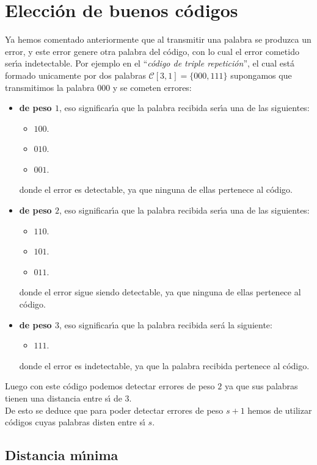 %
%

\section{Elecci\'on de buenos c\'odigos}

Ya hemos comentado anteriormente que al transmitir una palabra se produzca un
error, y este error genere otra palabra del c\'odigo, con lo cual el error
cometido ser\'{\i}a indetectable. Por ejemplo en el ``\emph{c\'odigo de triple
repetici\'on}'', el cual est\'a formado unicamente por dos palabras
$\mathcal{C}[3,1]=\{000,111\}$ supongamos que transmitimos la palabra $000$ y se
cometen errores:
\begin{itemize}
\item \textbf{de peso $1$}, eso significar\'{\i}a que la palabra recibida
ser\'{\i}a una de las siguientes:
\begin{itemize}
\item $100$.
\item $010$.
\item $001$.
\end{itemize}
donde el error es detectable, ya que ninguna de ellas pertenece al c\'odigo.
%
\newpage
%
\item \textbf{de peso $2$}, eso significar\'{\i}a que la palabra recibida
ser\'{\i}a una de las siguientes:
\begin{itemize}
\item $110$.
\item $101$.
\item $011$.
\end{itemize}
donde el error sigue siendo detectable, ya que ninguna de ellas pertenece al
c\'odigo. 
\item \textbf{de peso $3$}, eso significar\'{\i}a que la palabra recibida
ser\'a la siguiente:
\begin{itemize}
\item $111$.
\end{itemize}
donde el error es indetectable, ya que la palabra recibida pertenece al
c\'odigo.
\end{itemize}
Luego con este c\'odigo podemos detectar errores de peso $2$ ya que sus palabras
tienen una distancia entre s\'{\i} de $3$.\\

De esto se deduce que para poder detectar errores de peso $s+1$ hemos de 
utilizar c\'odigos cuyas palabras disten entre s\'{\i} $s$.

\subsection{Distancia m\'{\i}nima}

